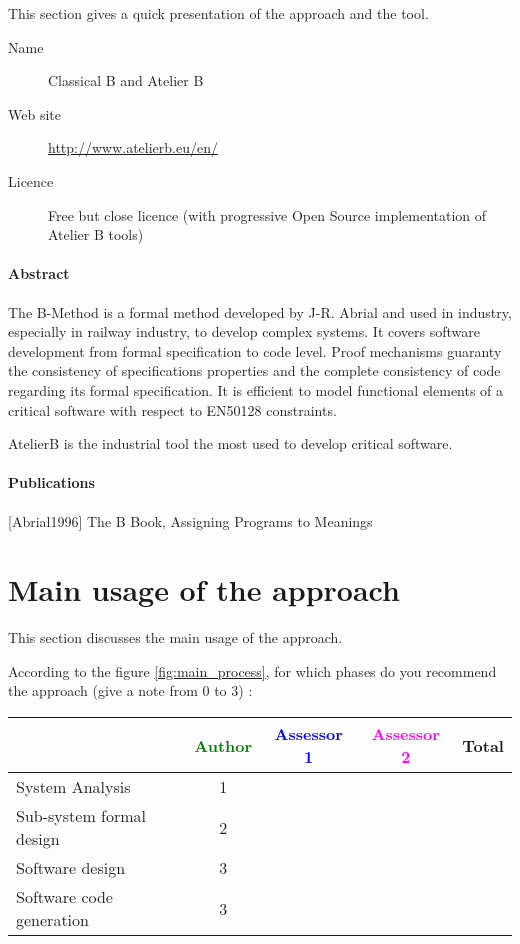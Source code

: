 This section gives a quick presentation of the approach and the tool.

\begin{description}
\item[Name] Classical B and Atelier B
\item[Web site] \url{http://www.atelierb.eu/en/}
\item[Licence] Free but close licence (with progressive Open Source implementation of Atelier B tools)
\end{description}

\paragraph{Abstract} 

The B-Method is a formal method developed by J-R. Abrial and used in industry, especially in railway industry, to develop complex systems. It covers software development from formal specification to code level. Proof mechanisms guaranty the consistency of specifications properties and the complete consistency of code regarding its formal specification. It is efficient to model  functional  elements of a critical software with respect to  EN50128 constraints.

AtelierB is the industrial  tool the most used to develop critical software.

\paragraph{Publications} 
[Abrial1996] The B Book, Assigning Programs to Meanings


\section{Main usage of the approach}
\label{main_usage}
This section discusses the main usage of the approach.

According to the figure \ref{fig:main_process}, for which phases do you recommend the approach (give a note from 0 to  3) :

\begin{tabular}{|l | c | c | c | c|}
\hline
& \textcolor{green}{Author} & \textcolor{blue}{Assessor 1} & \textcolor{magenta}{Assessor 2} & Total \\
\hline 
System Analysis & 1 & & &  \\
\hline
Sub-system formal design & 2 & & & \\
\hline
Software design & 3 & & & \\
\hline
Software code generation & 3 & & & \\
\hline
\end{tabular}


